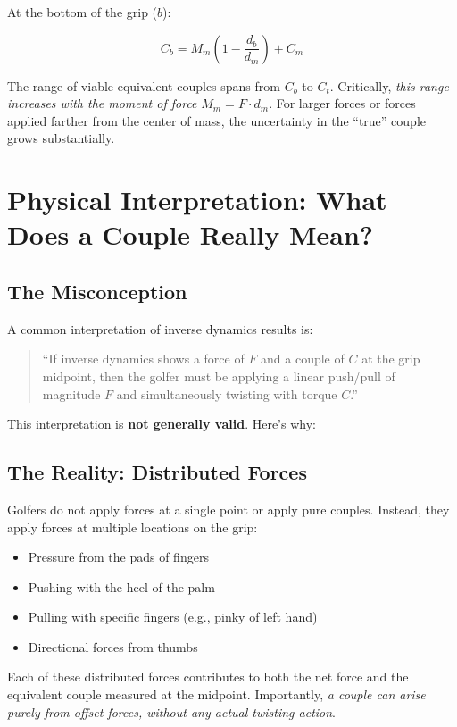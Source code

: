 \documentclass[11pt,a4paper]{article}
\begin{document}
At the bottom of the grip ($b$):

\begin{equation}
C_b = M_m \left(1 - \frac{d_b}{d_m}\right) + C_m
\end{equation}

The range of viable equivalent couples spans from $C_b$ to $C_t$. Critically, \emph{this range increases with the moment of force} $M_m = F \cdot d_m$. For larger forces or forces applied farther from the center of mass, the uncertainty in the ``true'' couple grows substantially.

\section{Physical Interpretation: What Does a Couple Really Mean?}

\subsection{The Misconception}

A common interpretation of inverse dynamics results is:
\begin{quote}
    ``If inverse dynamics shows a force of $F$ and a couple of $C$ at the grip midpoint, then the golfer must be applying a linear push/pull of magnitude $F$ and simultaneously twisting with torque $C$.''
\end{quote}

This interpretation is \textbf{not generally valid}. Here's why:

\subsection{The Reality: Distributed Forces}

Golfers do not apply forces at a single point or apply pure couples. Instead, they apply forces at multiple locations on the grip:
\begin{itemize}
    \item Pressure from the pads of fingers
    \item Pushing with the heel of the palm
    \item Pulling with specific fingers (e.g., pinky of left hand)
    \item Directional forces from thumbs
\end{itemize}

Each of these distributed forces contributes to both the net force and the equivalent couple measured at the midpoint. Importantly, \emph{a couple can arise purely from offset forces, without any actual twisting action}.
\end{document}
